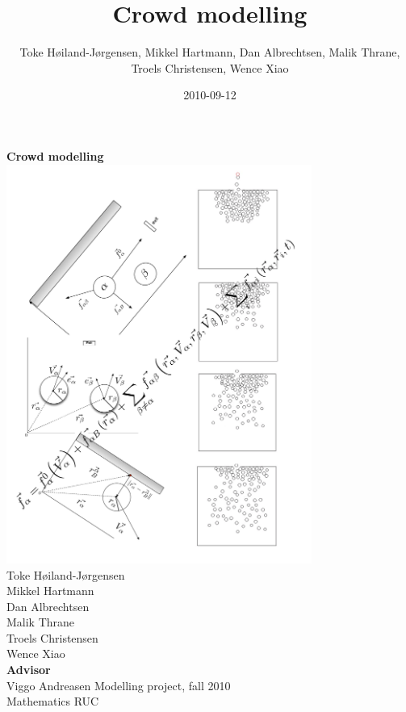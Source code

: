 \documentclass[a4paper,11pt,twoside]{scrartcl}
\title{Crowd modelling}
\author{Toke Høiland-Jørgensen, Mikkel Hartmann, Dan Albrechtsen, Malik 
Thrane, Troels Christensen, Wence Xiao}
\date{2010-09-12}
\begin{document}

\begin{titlepage}
    \begin{center}
        {\Huge \sffamily \textbf{Crowd modelling\\[2cm]
        }}\includegraphics[width=10cm]{Figures/Frontpage}
        \\[2cm]
        {\large Toke Høiland-Jørgensen \\
        Mikkel Hartmann\\
        Dan Albrechtsen\\
        Malik Thrane\\
        Troels Christensen\\
        Wence Xiao\\
        [0.5cm] }
        {\small \textbf{\textsf{Advisor}}\\
        Viggo Andreasen}
        \vfill
        \textsf{Modelling project, fall 2010\\
        Mathematics RUC}
	\end{center}
    \clearpage
%    
\end{titlepage}
\tableofcontents
\listoffigures
\listoftables
\lstlistoflistings
\clearpage

\clearpage

\clearpage

\clearpage

\clearpage

\clearpage

\clearpage

\clearpage

\clearpage

\clearpage


\clearpage
\end{document}

